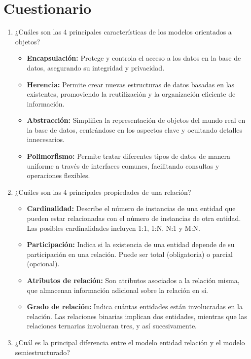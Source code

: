 \documentclass[a4paper,12pt]{article}
\begin{document}
\section*{Cuestionario}

\begin{enumerate}
    \item \textcolor{sun}{¿Cuáles son las 4 principales características de los modelos orientados a objetos?}
    \begin{itemize}
      \item \textcolor{water}{\textbf{Encapsulación:}} Protege y controla el acceso a los datos en la base de datos, asegurando su integridad y privacidad.
      \item \textcolor{water}{\textbf{Herencia:}} Permite crear nuevas estructuras de datos basadas en las existentes, promoviendo la reutilización y la organización eficiente de información.      
      \item \textcolor{water}{\textbf{Abstracción:}} Simplifica la representación de objetos del mundo real en la base de datos, centrándose en los aspectos clave y ocultando detalles innecesarios.
      \item \textcolor{water}{\textbf{Polimorfismo:}} Permite tratar diferentes tipos de datos de manera uniforme a través de interfaces comunes, facilitando consultas y operaciones flexibles.
    \end{itemize}

    \item \textcolor{sun}{¿Cuáles son las 4 principales propiedades de una relación?}
    \begin{itemize}
      \item \textcolor{water}{\textbf{Cardinalidad:}} Describe el número de instancias de una entidad que pueden estar relacionadas con el número de instancias de otra entidad. Las posibles cardinalidades incluyen 1:1, 1:N, N:1 y M:N.
      \item \textcolor{water}{\textbf{Participación:}} Indica si la existencia de una entidad depende de su participación en una relación. Puede ser total (obligatoria) o parcial (opcional).
      \item \textcolor{water}{\textbf{Atributos de relación:}} Son atributos asociados a la relación misma, que almacenan información adicional sobre la relación en sí.
      \item \textcolor{water}{\textbf{Grado de relación:}} Indica cuántas entidades están involucradas en la relación. Las relaciones binarias implican dos entidades, mientras que las relaciones ternarias involucran tres, y así sucesivamente.
    \end{itemize}
    \thispagestyle{fancy} %
    \item \textcolor{sun}{¿Cuál es la principal diferencia entre el modelo entidad relación y el modelo
    semiestructurado?}


\end{enumerate}
\end{document}
